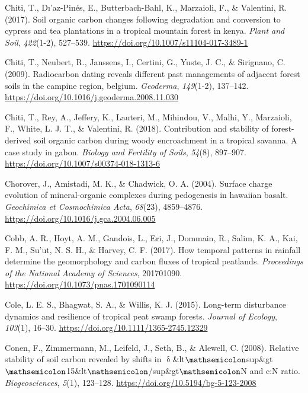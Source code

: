 \documentclass[]{article}
\begin{document}
\leavevmode\hypertarget{ref-Chiti_2017}{}%
Chiti, T., Dı'az-Pinés, E., Butterbach-Bahl, K., Marzaioli, F., \&
Valentini, R. (2017). Soil organic carbon changes following degradation
and conversion to cypress and tea plantations in a tropical mountain
forest in kenya. \emph{Plant and Soil}, \emph{422}(1-2), 527--539.
\url{https://doi.org/10.1007/s11104-017-3489-1}

\leavevmode\hypertarget{ref-Chiti_2009}{}%
Chiti, T., Neubert, R., Janssens, I., Certini, G., Yuste, J. C., \&
Sirignano, C. (2009). Radiocarbon dating reveals different past
managements of adjacent forest soils in the campine region, belgium.
\emph{Geoderma}, \emph{149}(1-2), 137--142.
\url{https://doi.org/10.1016/j.geoderma.2008.11.030}

\leavevmode\hypertarget{ref-Chiti_2018}{}%
Chiti, T., Rey, A., Jeffery, K., Lauteri, M., Mihindou, V., Malhi, Y.,
Marzaioli, F., White, L. J. T., \& Valentini, R. (2018). Contribution
and stability of forest-derived soil organic carbon during woody
encroachment in a tropical savanna. A case study in gabon. \emph{Biology
and Fertility of Soils}, \emph{54}(8), 897--907.
\url{https://doi.org/10.1007/s00374-018-1313-6}

\leavevmode\hypertarget{ref-Chorover_2004}{}%
Chorover, J., Amistadi, M. K., \& Chadwick, O. A. (2004). Surface charge
evolution of mineral-organic complexes during pedogenesis in hawaiian
basalt. \emph{Geochimica et Cosmochimica Acta}, \emph{68}(23),
4859--4876. \url{https://doi.org/10.1016/j.gca.2004.06.005}

\leavevmode\hypertarget{ref-Cobb_2017}{}%
Cobb, A. R., Hoyt, A. M., Gandois, L., Eri, J., Dommain, R., Salim, K.
A., Kai, F. M., Su'ut, N. S. H., \& Harvey, C. F. (2017). How temporal
patterns in rainfall determine the geomorphology and carbon fluxes of
tropical peatlands. \emph{Proceedings of the National Academy of
Sciences}, 201701090. \url{https://doi.org/10.1073/pnas.1701090114}

\leavevmode\hypertarget{ref-Cole_2015}{}%
Cole, L. E. S., Bhagwat, S. A., \& Willis, K. J. (2015). Long-term
disturbance dynamics and resilience of tropical peat swamp forests.
\emph{Journal of Ecology}, \emph{103}(1), 16--30.
\url{https://doi.org/10.1111/1365-2745.12329}

\leavevmode\hypertarget{ref-Conen_2008}{}%
Conen, F., Zimmermann, M., Leifeld, J., Seth, B., \& Alewell, C. (2008).
Relative stability of soil carbon revealed by shifts in
\(\updelta\)\&lt\(\mathsemicolon\)sup\&gt\(\mathsemicolon\)15\&lt\(\mathsemicolon\)/sup\&gt\(\mathsemicolon\)N
and c:N ratio. \emph{Biogeosciences}, \emph{5}(1), 123--128.
\url{https://doi.org/10.5194/bg-5-123-2008}
\end{document}
